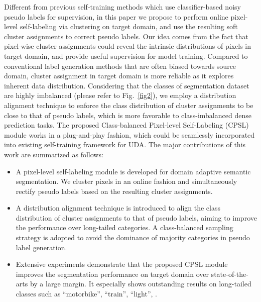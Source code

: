 \documentclass[10pt,twocolumn,letterpaper]{article}
\begin{document}
	Different from previous self-training methods which use classifier-based noisy pseudo labels for supervision, in this paper we propose to perform online pixel-level self-labeling via clustering on target domain, and use the resulting soft cluster assignments to correct pseudo labels. Our idea comes from the fact that pixel-wise cluster assignments could reveal the intrinsic distributions of pixels in target domain, and provide useful supervision for model training. Compared to conventional label generation methods that are often biased towards source domain, cluster assignment in target domain is more reliable as it explores inherent data distribution. Considering that the classes of segmentation dataset are highly imbalanced (please refer to Fig.~\ref{fig2}), we employ a distribution alignment technique to enforce the class distribution of cluster assignments to be close to that of pseudo labels, which is more favorable to class-imbalanced dense prediction tasks. The proposed Class-balanced Pixel-level Self-Labeling (CPSL) module works in a plug-and-play fashion, which could be seamlessly incorporated into existing self-training framework for UDA. The major contributions of this work are summarized as follows:\\
\vspace{-0.5em}
	\vspace{-1.0em}\begin{itemize}[leftmargin=*]
		\item[] A pixel-level self-labeling module is developed for domain adaptive semantic segmentation. We cluster pixels in an online fashion and simultaneously rectify pseudo labels based on the resulting cluster assignments.\vspace{-0.5em}
		\item[] A distribution alignment technique is introduced to align the class distribution of cluster assignments to that of pseudo labels, aiming to improve the performance over long-tailed categories. A class-balanced sampling strategy is adopted to avoid the dominance of majority categories in pseudo label generation. \vspace{-0.5em}
		\item[] Extensive experiments demonstrate that the proposed CPSL module improves the segmentation performance on target domain over state-of-the-arts by a large margin. It especially shows outstanding results on long-tailed classes such as ``motorbike'', ``train'', ``light'', \etc.
	\end{itemize}\vspace{-1.0em}
	
\end{document}
